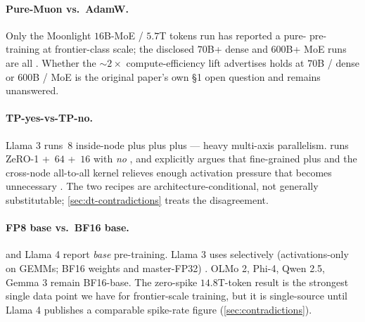 \paragraph{Pure-Muon vs.\ AdamW.}
Only the Moonlight $16$B-MoE / $5.7$T tokens run \citep{muon-moonlight2025}
has reported a pure- pre-training at frontier-class scale; the
disclosed $70$B+ dense and $600$B+ MoE runs are all . Whether
the $\sim 2\times$ compute-efficiency lift  advertises holds at
$70$B / dense or $600$B / MoE is the original paper's own §1 open
question and remains unanswered.

\paragraph{TP-yes-vs-TP-no.}
Llama 3 \citep{meta-llama3} runs $\,8$ inside-node plus  plus  plus
 --- heavy multi-axis parallelism.  \citep{deepseek-v3}
runs ZeRO-1 + $\,64$ + $\,16$  with \emph{no} , and
explicitly argues that fine-grained  plus  and the
cross-node all-to-all kernel relieves enough activation pressure that
 becomes unnecessary \citep[\S 3.2.2]{deepseek-v3}. The two
recipes are architecture-conditional, not generally substitutable;
\cref{sec:dt-contradictions} treats the disagreement.

\paragraph{FP8 base vs.\ BF16 base.}
 \citep[\S 3.3]{deepseek-v3} and Llama 4
\citep{meta-llama4} report  \emph{base} pre-training. Llama 3 uses
 selectively (activations-only on  GEMMs; BF16 weights and
master-FP32) \citep{meta-llama3}. OLMo 2, Phi-4, Qwen 2.5, Gemma 3
remain BF16-base. The  zero-spike $14.8$T-token result
\citep[abstract]{deepseek-v3} is the strongest single data point we
have for frontier-scale  training, but it is single-source until
Llama 4 publishes a comparable spike-rate figure
(\cref{sec:contradictions}).

